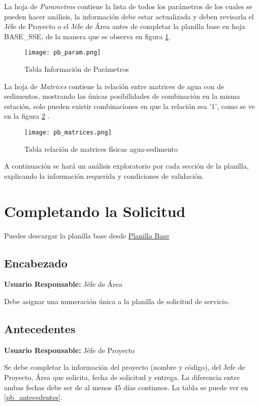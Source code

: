 La hoja de \textit{Parametros} contiene la lista de todos los parámetros de los cuales se pueden hacer análisis, la información debe estar actualizada y deben revisarla el Jéfe de Proyecto o el Jéfe de Área antes de completar la planilla base en hoja \MakeUppercase{base\_sse}, de la manera que se observa en figura \ref{pb_param}.

\begin{figure}
	\centering
	\texttt{[image: pb\_param.png]}
	\caption{Tabla Información de Parámetros}
	\label{pb_param}
\end{figure}

La hoja de \textit{Matrices} contiene la relación entre matrices de agua con de sedimentos, mostrando las únicas posibilidades de combinación en la misma estación, solo pueden existir combinaciones en que la relación sea '1', como se ve en la figura \ref{pb_matrices} .

\begin{figure}
	\centering
	\texttt{[image: pb\_matrices.png]}
	\caption{Tabla relación de matrices físicas agua-sedimento}
	\label{pb_matrices}
\end{figure}

A continuación se hará un análisis exploratorio por cada sección de la planilla, explicando la información requerida y condiciones de validación.

\section{Completando la Solicitud}

Puedes descargar la planilla base desde \href{http://www.mediafire.com/view/levr2xh9bytaki2/Patron_FL.xlsx}{Planilla Base}

\subsection{Encabezado}

\textbf{Usuario Responsable:} Jéfe de Área

Debe asignar una numeración única a la planilla de solicitud de servicio.

\subsection{Antecedentes}

\textbf{Usuario Responsable:} Jéfe de Proyecto

Se debe completar la información del proyecto (nombre y código), del Jefe de Proyecto, Área que solicita, fecha de solicitud y entrega. La diferencia entre ambas fechas debe ser de al menos 45 días continuos. La tabla se puede ver en \ref{pb_antecedentes}.

